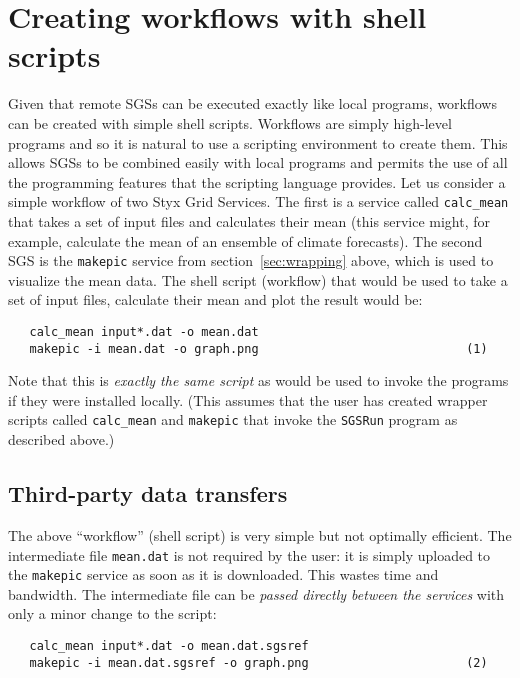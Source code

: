 \documentclass[a4paper]{article}
\begin{document}
\section{Creating workflows with shell scripts}\label{sec:shellscripts}

Given that remote SGSs can be executed exactly like local programs, workflows can be created with simple shell scripts.  Workflows are simply high-level programs and so it is natural to use a scripting environment to create them.  This allows SGSs to be combined easily with local programs and permits the use of all the programming features that the scripting language provides.  Let us consider a simple workflow of two Styx Grid Services.  The first is a service called \texttt{calc\_mean} that takes a set of input files and calculates their mean (this service might, for example, calculate the mean of an ensemble of climate forecasts).  The second SGS is the \texttt{makepic} service from section~\ref{sec:wrapping} above, which is used to visualize the mean data.  The shell script (workflow) that would be used to take a set of input files, calculate their mean and plot the result would be:

\begin{verbatim}
   calc_mean input*.dat -o mean.dat
   makepic -i mean.dat -o graph.png                             (1)
\end{verbatim}

Note that this is \textit{exactly the same script\/} as would be used to invoke the programs if they were installed locally.  (This assumes that the user has created wrapper scripts called \texttt{calc\_mean} and \texttt{makepic} that invoke the \texttt{SGSRun} program as described above.)

\subsection{Third-party data transfers}\label{sec:datapassing}

The above ``workflow'' (shell script) is very simple but not optimally efficient.  The intermediate file \texttt{mean.dat} is not required by the user: it is simply uploaded to the \texttt{makepic} service as soon as it is downloaded.  This wastes time and bandwidth.  The intermediate file can be \textit{passed directly between the services\/} with only a minor change to the script:

\begin{verbatim}
   calc_mean input*.dat -o mean.dat.sgsref
   makepic -i mean.dat.sgsref -o graph.png                      (2)
\end{verbatim}
\end{document}
